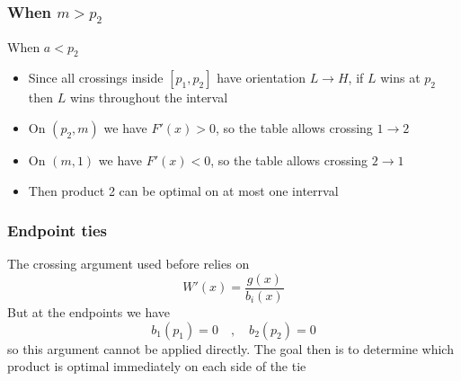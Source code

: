 \documentclass[10pt]{beamer}
\begin{document}
\begin{frame}
    \frametitle{When $m>p_2$}
    When $a<p_2$
    \begin{itemize}
        \item Since all crossings inside $[p_1,p_2]$ have orientation $L \to H$, if $L$ wins at $p_2$ then $L$ wins throughout the interval 
        \item On $(p_2,m)$ we have $F'(x)>0$, so the table allows crossing $1\to2$
        \item On $(m,1)$ we have $F'(x)<0$, so the table allows crossing $2\to1$
        \item Then product 2 can be optimal on at most one interrval
    \end{itemize}
    \begin{figure}[H]
    \centering
    \end{figure}

\end{frame}

\begin{frame}
    \frametitle{Endpoint ties}
    The crossing argument used before relies on $$W'(x) = \frac{g(x)}{b_i(x)}$$
    But at the endpoints we have 
    $$b_1(p_1)=0 \quad ,\quad b_2(p_2)=0$$
    so this argument cannot be applied directly. The goal then is to determine which product is optimal immediately on each side of the tie
\end{frame}
\end{document}
